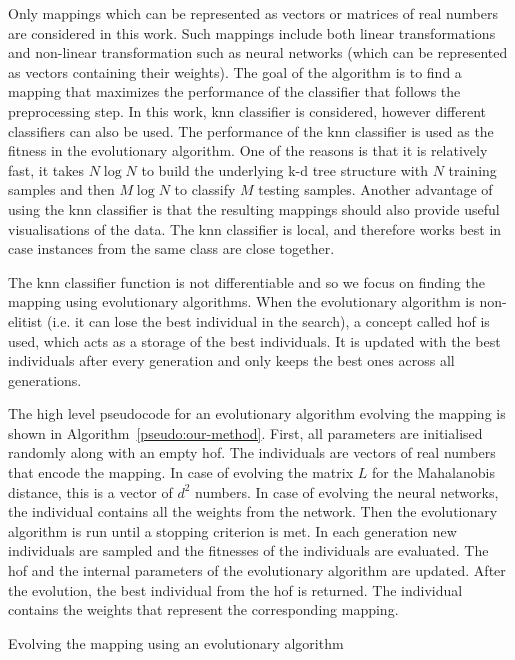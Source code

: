 \documentclass[12pt,a4paper]{report}
\begin{document}
Only mappings which can be represented as vectors or matrices of real numbers are considered in this work. Such mappings include both linear transformations and non-linear transformation such as neural networks (which can be represented as vectors containing their weights). The goal of the algorithm is to find a mapping that maximizes the performance of the classifier that follows the preprocessing step. In this work, \ac{knn} classifier is considered, however different classifiers can also be used. The performance of the \ac{knn} classifier is used as the fitness in the evolutionary algorithm. One of the reasons is that it is relatively fast, it takes $N\log{N}$ to build the underlying k-d tree structure with $N$ training samples and then $M \log{N}$ to classify $M$ testing samples. Another advantage of using the \ac{knn} classifier is that the resulting mappings should also provide useful visualisations of the data. The \ac{knn} classifier is local, and therefore works best in case instances from the same class are close together.

The \ac{knn} classifier function is not differentiable and so we focus on finding the mapping using evolutionary algorithms. When the evolutionary algorithm is non-elitist (i.e. it can lose the best individual in the search), a concept called \ac{hof} is used, which acts as a storage of the best individuals. It is updated with the best individuals after every generation and only keeps the best ones across all generations.

The high level pseudocode for an evolutionary algorithm evolving the mapping is shown in Algorithm~\ref{pseudo:our-method}. First, all parameters are initialised randomly along with an empty \ac{hof}. The individuals are vectors of real numbers that encode the mapping. In case of evolving the matrix $L$ for the Mahalanobis distance, this is a vector of $d^2$ numbers. In case of evolving the neural networks, the individual contains all the weights from the network. Then the evolutionary algorithm is run until a stopping criterion is met. In each generation new individuals are sampled and the fitnesses of the individuals are evaluated. The \ac{hof} and the internal parameters of the evolutionary algorithm are updated. After the evolution, the best individual from the \ac{hof} is returned. The individual contains the weights that represent the corresponding mapping.

\begin{algorithm}[t]
\caption{Evolving the mapping using an evolutionary algorithm} \label{pseudo:our-method}
\DontPrintSemicolon
\LinesNumbered
{}
\end{algorithm} 
\end{document}

